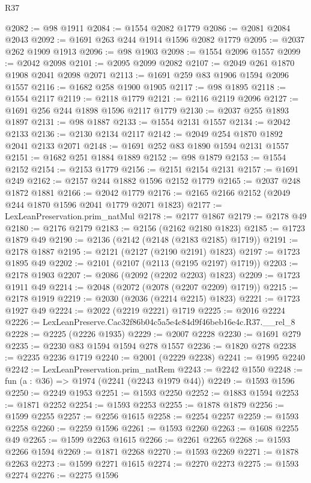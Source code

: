 \begin{lexlean}{R37}
\begin{coremodule}
@2082 := @98 @1911
@2084 := @1554 @2082 @1779
@2086 := @2081 @2084 @2043
@2092 := @1691 @263 @244 @1914 @1596 @2082 @1779
@2095 := @2037 @262 @1909 @1913
@2096 := @98 @1903
@2098 := @1554 @2096 @1557
@2099 := @2042 @2098
@2101 := @2095 @2099 @2082
@2107 := @2049 @261 @1870 @1908 @2041 @2098 @2071
@2113 := @1691 @259 @83 @1906 @1594 @2096 @1557
@2116 := @1682 @258 @1900 @1905
@2117 := @98 @1895
@2118 := @1554 @2117
@2119 := @2118 @1779
@2121 := @2116 @2119 @2096
@2127 := @1691 @256 @244 @1898 @1596 @2117 @1779
@2130 := @2037 @255 @1893 @1897
@2131 := @98 @1887
@2133 := @1554 @2131 @1557
@2134 := @2042 @2133
@2136 := @2130 @2134 @2117
@2142 := @2049 @254 @1870 @1892 @2041 @2133 @2071
@2148 := @1691 @252 @83 @1890 @1594 @2131 @1557
@2151 := @1682 @251 @1884 @1889
@2152 := @98 @1879
@2153 := @1554 @2152
@2154 := @2153 @1779
@2156 := @2151 @2154 @2131
@2157 := @1691 @249
@2162 := @2157 @244 @1882 @1596 @2152 @1779
@2165 := @2037 @248 @1872 @1881
@2166 := @2042 @1779
@2176 := @2165 @2166 @2152 (@2049 @244 @1870 @1596 @2041 @1779 @2071 @1823)
@2177 := LexLeanPreservation.prim_natMul
@2178 := @2177 @1867
@2179 := @2178 @49
@2180 := @2176 @2179
@2183 := @2156 (@2162 @2180 @1823)
@2185 := @1723 @1879 @49
@2190 := @2136 (@2142 (@2148 (@2183 @2185) @1719))
@2191 := @2178 @1887
@2195 := @2121 (@2127 (@2190 @2191) @1823)
@2197 := @1723 @1895 @49
@2202 := @2101 (@2107 (@2113 (@2195 @2197) @1719))
@2203 := @2178 @1903
@2207 := @2086 (@2092 (@2202 @2203) @1823)
@2209 := @1723 @1911 @49
@2214 := @2048 (@2072 (@2078 (@2207 @2209) @1719))
@2215 := @2178 @1919
@2219 := @2030 (@2036 (@2214 @2215) @1823)
@2221 := @1723 @1927 @49
@2224 := @2022 (@2219 @2221) @1719
@2225 := @2016 @2224
@2226 := LexLeanPreserve.Cac32f86b04c5a5e4c84d9f46beb16e4c.R37.__rel_8
@2228 := @2225 (@2226 @1935)
@2229 := @2007 @2228
@2230 := @1691 @279
@2235 := @2230 @83 @1594 @1594 @278 @1557
@2236 := @1820 @278
@2238 := @2235 @2236 @1719
@2240 := @2001 (@2229 @2238)
@2241 := @1995 @2240
@2242 := LexLeanPreservation.prim_natRem
@2243 := @2242 @1550
@2248 := fun (a : @36) => @1974 (@2241 (@2243 @1979 @44))
@2249 := @1593 @1596
@2250 := @2249 @1953
@2251 := @1593 @2250
@2252 := @1883 @1594
@2253 := @1871 @2252
@2254 := @1593 @2253
@2255 := @1878 @1879
@2256 := @1599 @2255
@2257 := @2256 @1615
@2258 := @2254 @2257
@2259 := @1593 @2258
@2260 := @2259 @1596
@2261 := @1593 @2260
@2263 := @1608 @2255 @49
@2265 := @1599 @2263 @1615
@2266 := @2261 @2265
@2268 := @1593 @2266 @1594
@2269 := @1871 @2268
@2270 := @1593 @2269
@2271 := @1878 @2263
@2273 := @1599 @2271 @1615
@2274 := @2270 @2273
@2275 := @1593 @2274
@2276 := @2275 @1596

\end{coremodule}
\end{lexlean}
